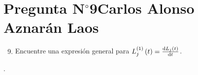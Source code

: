 \section{Pregunta N$^{\circ}$9\qquad Carlos Alonso Aznarán Laos}

\begin{frame}
    \begin{enumerate}\setcounter{enumi}{8}
        \item

              Encuentre una expresión general para
              \begin{math}
                  L_{j}^{\left(1\right)}\left(t\right)=
                  \diff{L_{j}\left(t\right)}{t}
              \end{math}.
    \end{enumerate}

    \begin{solution}
        .
    \end{solution}
\end{frame}